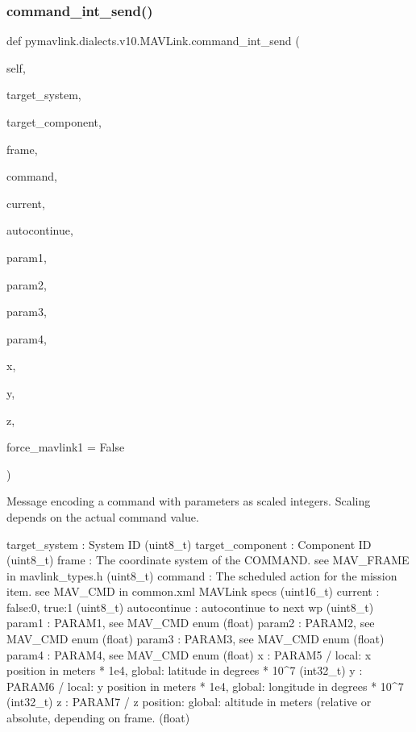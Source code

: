 \begin{DoxyVerb}
\begin{DoxyVerb}
\subsubsection{\texorpdfstring{command\+\_\+int\+\_\+send()}{command\_int\_send()}}
{\footnotesize\ttfamily def pymavlink.\+dialects.\+v10.\+M\+A\+V\+Link.\+command\+\_\+int\+\_\+send (\begin{DoxyParamCaption}\item[{}]{self,  }\item[{}]{target\+\_\+system,  }\item[{}]{target\+\_\+component,  }\item[{}]{frame,  }\item[{}]{command,  }\item[{}]{current,  }\item[{}]{autocontinue,  }\item[{}]{param1,  }\item[{}]{param2,  }\item[{}]{param3,  }\item[{}]{param4,  }\item[{}]{x,  }\item[{}]{y,  }\item[{}]{z,  }\item[{}]{force\+\_\+mavlink1 = {\ttfamily False} }\end{DoxyParamCaption})}

\begin{DoxyVerb}Message encoding a command with parameters as scaled integers. Scaling
depends on the actual command value.

target_system             : System ID (uint8_t)
target_component          : Component ID (uint8_t)
frame                     : The coordinate system of the COMMAND. see MAV_FRAME in mavlink_types.h (uint8_t)
command                   : The scheduled action for the mission item. see MAV_CMD in common.xml MAVLink specs (uint16_t)
current                   : false:0, true:1 (uint8_t)
autocontinue              : autocontinue to next wp (uint8_t)
param1                    : PARAM1, see MAV_CMD enum (float)
param2                    : PARAM2, see MAV_CMD enum (float)
param3                    : PARAM3, see MAV_CMD enum (float)
param4                    : PARAM4, see MAV_CMD enum (float)
x                         : PARAM5 / local: x position in meters * 1e4, global: latitude in degrees * 10^7 (int32_t)
y                         : PARAM6 / local: y position in meters * 1e4, global: longitude in degrees * 10^7 (int32_t)
z                         : PARAM7 / z position: global: altitude in meters (relative or absolute, depending on frame. (float)\end{DoxyVerb}
 \mbox{\label{classpymavlink_1_1dialects_1_1v10_1_1MAVLink_a5d2568416da43730df5544a5c1e7b7a5}} 

\end{DoxyVerb}
\end{DoxyVerb}
